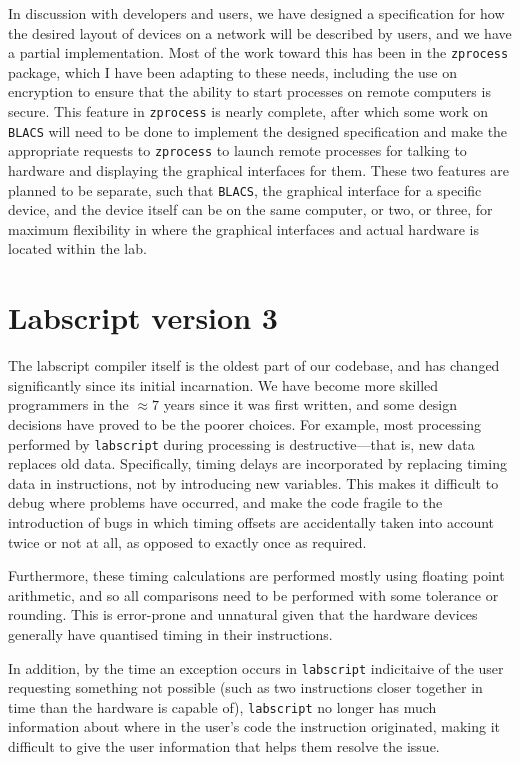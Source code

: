 In discussion with developers and users, we have designed a specification for how the desired layout of devices on a network will be described by users, and we have a partial implementation. Most of the work toward this has been in the \texttt{zprocess} package, which I have been adapting to these needs, including the use on encryption to ensure that the ability to start processes on remote computers is secure. This feature in \texttt{zprocess} is nearly complete, after which some work on \texttt{BLACS} will need to be done to implement the designed specification and make the appropriate requests to \texttt{zprocess} to launch remote processes for talking to hardware and displaying the graphical interfaces for them. These two features are planned to be separate, such that \texttt{BLACS}, the graphical interface for a specific device, and the device itself can be on the same computer, or two, or three, for maximum flexibility in where the graphical interfaces and actual hardware is located within the lab.

\section{Labscript version 3}

The labscript compiler itself is the oldest part of our codebase, and has changed significantly since its initial incarnation. We have become more skilled programmers in the $\approx 7$ years since it was first written, and some design decisions have proved to be the poorer choices. For example, most processing performed by \texttt{labscript} during processing is destructive---that is, new data replaces old data. Specifically, timing delays are incorporated by replacing timing data in instructions, not by introducing new variables. This makes it difficult to debug where problems have occurred, and make the code fragile to the introduction of bugs in which timing offsets are accidentally taken into account twice or not at all, as opposed to exactly once as required.

Furthermore, these timing calculations are performed mostly using floating point arithmetic, and so all comparisons need to be performed with some tolerance or rounding. This is error-prone and unnatural given that the hardware devices generally have quantised timing in their instructions.

In addition, by the time an exception occurs in \texttt{labscript} indicitaive of the user requesting something not possible (such as two instructions closer together in time than the hardware is capable of), \texttt{labscript} no longer has much information about where in the user's code the instruction originated, making it difficult to give the user information that helps them resolve the issue.

